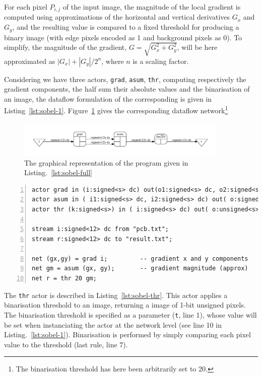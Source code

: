 For each pixel $P_{i,j}$ of the input image, the magnitude of the local gradient is computed using
approximations of the horizontal and vertical derivatives $G_x$ and $G_y$, and the resulting value
is compared to a fixed threshold for producing a binary image (with edge pixels encoded as 1 and
background pixels as 0). To simplify, the magnitude of the gradient, $G=\sqrt{G_x^2+G_y^2}$, will be
here approximated as $|G_x|+|G_y|/2^n$, where $n$ is a scaling factor.

Considering we have three actors, \verb|grad|, \verb|asum|, \verb|thr|, computing respectively the
gradient components, the half sum their absolute values and the binarisation of an image, the dataflow
formulation of the corresponding is given in Listing~\ref{lst:sobel-1}.  Figure~\ref{fig:sobel-dot}
gives the corresponding dataflow network\footnote{The binarisation threshold has here been
  arbitrarily set to 20.}

\begin{figure}[htbp]
  \centering
 \includegraphics[width=0.9\textwidth]{./figs/sobel-dot.pdf}
  \caption{The graphical representation of the program given in Listing.~\ref{lst:sobel-full}}
  \label{fig:sobel-dot}
\end{figure}

\begin{lstlisting}[style=CaphStyle,numbers=left,numberstyle=\tiny,caption={A Sobel edge extraction
    application in Caph (top level description)},label={lst:sobel-1}]
actor grad in (i:signed<s> dc) out(o1:signed<s> dc, o2:signed<s> dc) ...
actor asum in ( i1:signed<s> dc, i2:signed<s> dc) out( o:signed<s> dc)  ...
actor thr (k:signed<s>) in ( i:signed<s> dc) out( o:unsigned<s> dc) ...

stream i:signed<12> dc from "pcb.txt";
stream r:signed<12> dc to "result.txt";

net (gx,gy) = grad i;         -- gradient x and y components
net gm = asum (gx, gy);       -- gradient magnitude (approx)
net r = thr 20 gm;
\end{lstlisting}

\medskip
The \verb|thr| actor is described in Listing~\ref{lst:sobel-thr}. This actor applies a binarisation
threshold to an image, returning a image of 1-bit unsigned pixels. The binarisation threshold is
specified as a parameter (\verb|t|, line 1), whose value will be set when instanciating the actor at
the network level (see line 10 in Listing.~\ref{lst:sobel-1}). Binarisation is performed by simply
comparing each pixel value to the threshold (last rule, line 7). 

